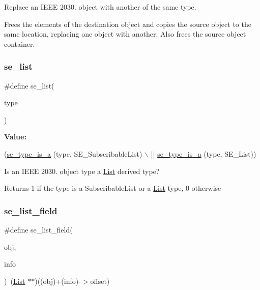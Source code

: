 Replace an I\+E\+EE 2030. object with another of the same type. 

Frees the elements of the destination object and copies the source object to the same location, replacing one object with another. Also frees the source object container. \mbox{\label{group__se__object_ga6434555a70cf68b6665831c6e241d86f}} 
\subsubsection{\texorpdfstring{se\+\_\+list}{se\_list}}
{\footnotesize\ttfamily \#define se\+\_\+list(\begin{DoxyParamCaption}\item[{}]{type }\end{DoxyParamCaption})}

{\bfseries Value\+:}
\begin{DoxyCode}
(\hyperlink{group__se__object_ga6a18ca73ed2f7d19fe79cf78283e9f2c}{se\_type\_is\_a} (type, SE\_SubscribableList) \(\backslash\)
           || \hyperlink{group__se__object_ga6a18ca73ed2f7d19fe79cf78283e9f2c}{se\_type\_is\_a} (type, SE\_List))
\end{DoxyCode}


Is an I\+E\+EE 2030. object type a \hyperlink{structList}{List} derived type? 

\begin{DoxyReturn}{Returns}
1 if the type is a Subscribable\+List or a \hyperlink{structList}{List} type, 0 otherwise 
\end{DoxyReturn}
\mbox{\label{group__se__object_gad1c4836517f639b152ab8cc59f2b7804}} 
\subsubsection{\texorpdfstring{se\+\_\+list\+\_\+field}{se\_list\_field}}
{\footnotesize\ttfamily \#define se\+\_\+list\+\_\+field(\begin{DoxyParamCaption}\item[{}]{obj,  }\item[{}]{info }\end{DoxyParamCaption})~(\hyperlink{structList}{List} $\ast$$\ast$)((obj)+(info)-\/$>$offset)}



